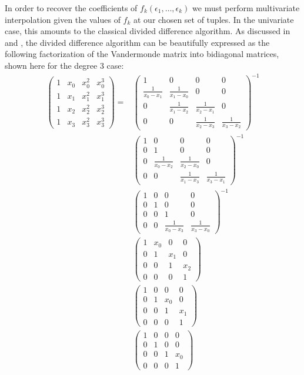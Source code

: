\documentclass[11pt]{article}
\begin{document}
In order to recover the coefficients of $f_k(\epsilon_1, \ldots, \epsilon_k)$ we must perform multivariate interpolation given the values of $f_k$ at our chosen set of tuples.
In the univariate case, this amounts to the classical divided difference algorithm.  As discussed in \cite{oruc2000explicit} and \cite{olver2006multivariate}, the divided
difference algorithm can be beautifully expressed as the following factorization of the Vandermonde matrix into bidiagonal matrices, shown here for the degree 3 case:
\begin{equation} \label{vandermonde}
\begin{aligned}
\left(\begin{matrix}1 & x_{0} & x_{0}^{2} & x_{0}^{3}\\1 & x_{1} & x_{1}^{2} & x_{1}^{3}\\1 & x_{2} & x_{2}^{2} & x_{2}^{3}\\1 & x_{3} & x_{3}^{2} & x_{3}^{3}\end{matrix}\right)
=& \left(\begin{matrix}1&0&0&0\\\frac{1}{x_{0}-x_{1}}&\frac{1}{x_{1}-x_{0}}&0&0\\0&\frac{1}{x_{1}-x_{2}}&\frac{1}{x_{2}-x_{1}}&0\\0&0&\frac{1}{x_{2}-x_{3}}&\frac{1}{x_{3}-x_{2}}\end{matrix}\right)^{-1} \\
 & \left(\begin{matrix}1&0&0&0\\0&1&0&0\\0&\frac{1}{x_{0}-x_{2}}&\frac{1}{x_{2}-x_{0}}&0\\0&0&\frac{1}{x_{1}-x_{3}}&\frac{1}{x_{3}-x_{1}}\end{matrix}\right)^{-1} \\
 & \left(\begin{matrix}1&0&0&0\\0&1&0&0\\0&0&1&0\\0&0&\frac{1}{x_{0}-x_{3}}&\frac{1}{x_{3}-x_{0}}\end{matrix}\right)^{-1} \\
 & \left(\begin{matrix}1&x_{0}&0&0\\0&1&x_{1}&0\\0&0&1&x_{2}\\0&0&0&1\end{matrix}\right) \\
 & \left(\begin{matrix}1&0&0&0\\0&1&x_{0}&0\\0&0&1&x_{1}\\0&0&0&1\end{matrix}\right) \\
 & \left(\begin{matrix}1&0&0&0\\0&1&0&0\\0&0&1&x_{0}\\0&0&0&1\end{matrix}\right) 
\end{aligned}
\end{equation}
\end{document}
